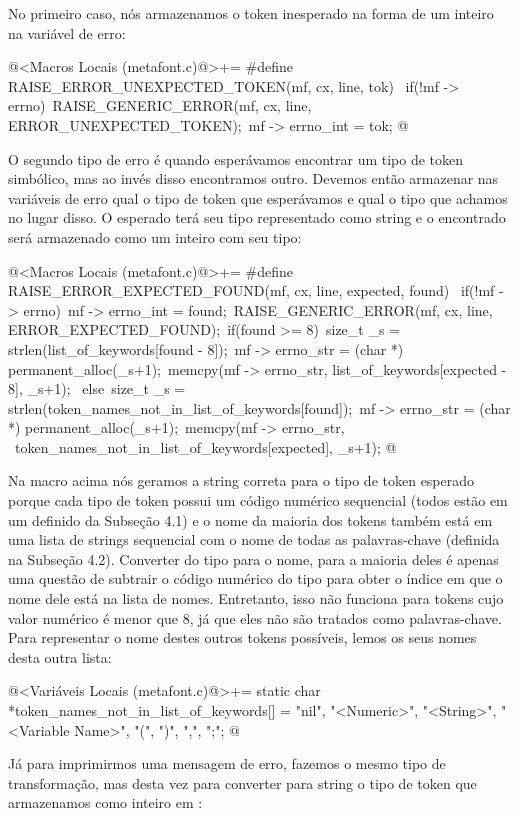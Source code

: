 No primeiro caso, nós armazenamos o token inesperado na forma de um
inteiro na variável de erro:

\iniciocodigo
@<Macros Locais (metafont.c)@>+=
#define RAISE_ERROR_UNEXPECTED_TOKEN(mf, cx, line, tok) {\
  if(!mf -> errno){\
    RAISE_GENERIC_ERROR(mf, cx, line, ERROR_UNEXPECTED_TOKEN);\
    mf -> errno_int = tok;}}
@
\fimcodigo

O segundo tipo de erro é quando esperávamos encontrar um tipo de token
simbólico, mas ao invés disso encontramos outro. Devemos então
armazenar nas variáveis de erro qual o tipo de token que esperávamos e
qual o tipo que achamos no lugar disso. O esperado terá seu tipo
representado como string e o encontrado será armazenado como um
inteiro com seu tipo:

\iniciocodigo
@<Macros Locais (metafont.c)@>+=
#define RAISE_ERROR_EXPECTED_FOUND(mf, cx, line, expected, found) {\
  if(!mf -> errno){\
    mf -> errno_int = found;\
    RAISE_GENERIC_ERROR(mf, cx, line, ERROR_EXPECTED_FOUND);\
    if(found >= 8){\
      size_t _s = strlen(list_of_keywords[found - 8]);\
      mf -> errno_str = (char *) permanent_alloc(_s+1);\
      memcpy(mf -> errno_str, list_of_keywords[expected - 8], _s+1);\
    } else{\
      size_t _s = strlen(token_names_not_in_list_of_keywords[found]);\
      mf -> errno_str = (char *) permanent_alloc(_s+1);\
      memcpy(mf -> errno_str, \
             token_names_not_in_list_of_keywords[expected], _s+1);}}}
@
\fimcodigo

Na macro acima nós geramos a string correta para o tipo de token
esperado porque cada tipo de token possui um código numérico
sequencial (todos estão em um \monoespaco{enum} definido da Subseção
4.1) e o nome da maioria dos tokens também está em uma lista de
strings sequencial com o nome de todas as palavras-chave (definida na
Subseção 4.2). Converter do tipo para o nome, para a maioria deles é
apenas uma questão de subtrair o código numérico do tipo para obter o
índice em que o nome dele está na lista de nomes. Entretanto, isso não
funciona para tokens cujo valor numérico é menor que 8, já que eles
não são tratados como palavras-chave. Para representar o nome destes
outros tokens possíveis, lemos os seus nomes desta outra lista:

\iniciocodigo
@<Variáveis Locais (metafont.c)@>+=
static char *token_names_not_in_list_of_keywords[] = {
  "nil", "<Numeric>", "<String>", "<Variable Name>", "(", ")", ",", ";"};
@
\fimcodigo

Já para imprimirmos uma mensagem de erro, fazemos o mesmo tipo de
transformação, mas desta vez para converter para string o tipo de
token que armazenamos como inteiro em \monoespaco{errno\_int}:

